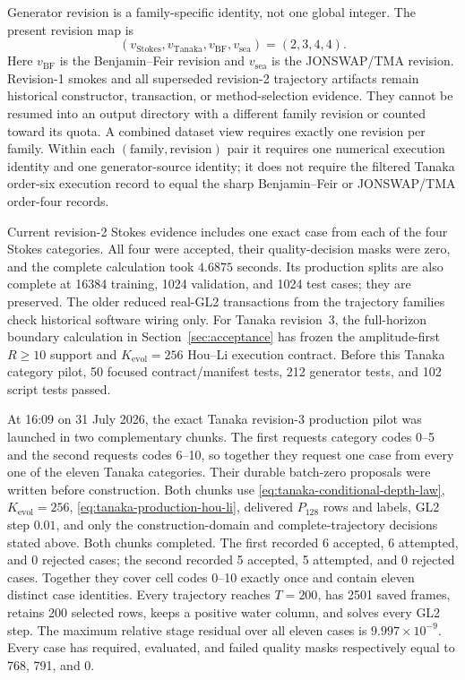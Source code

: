 \documentclass[11pt]{article}
\begin{document}
Generator revision is a family-specific identity, not one global integer.
The present revision map is
\begin{equation}
  (v_{\mathrm{Stokes}},v_{\mathrm{Tanaka}},v_{\mathrm{BF}},v_{\mathrm{sea}})
  =(2,3,4,4).
  \label{eq:paper-family-revisions}
\end{equation}
Here $v_{\mathrm{BF}}$ is the Benjamin--Feir revision and $v_{\mathrm{sea}}$
is the JONSWAP/TMA revision.  Revision-1 smokes and all superseded revision-2
trajectory artifacts remain historical constructor, transaction, or
method-selection evidence.  They cannot be resumed into an output directory
with a different family revision or counted toward its quota.  A combined dataset view requires
exactly one revision per family.  Within each
$(\text{family},\text{revision})$ pair it requires one numerical execution
identity and one generator-source identity; it does not require the filtered
Tanaka order-six execution record to equal the sharp Benjamin--Feir or
JONSWAP/TMA order-four records.

Current revision-2 Stokes evidence includes one exact case from each of
the four Stokes categories.  All four were accepted, their quality-decision
masks were zero, and the complete calculation took $4.6875$ seconds.  Its
production splits are also complete at 16384 training, 1024 validation, and
1024 test cases; they are preserved.  The
older reduced real-GL2 transactions from the trajectory families check
historical software wiring only.  For Tanaka revision~3, the full-horizon
boundary calculation in Section~\ref{sec:acceptance} has frozen the
amplitude-first $R\geq10$ support and $K_{\mathrm{evol}}=256$ Hou--Li
execution contract.  Before this Tanaka category pilot, 50 focused
contract/manifest tests, 212 generator tests, and 102 script tests passed.

At 16:09 on 31 July 2026, the exact Tanaka revision-3 production pilot was
launched in two complementary chunks.  The first requests category codes
0--5 and the second requests codes 6--10, so together they request one case
from every one of the eleven Tanaka categories.  Their durable batch-zero
proposals were written before construction.  Both chunks use
\eqref{eq:tanaka-conditional-depth-law},
$K_{\mathrm{evol}}=256$, \eqref{eq:tanaka-production-hou-li}, delivered
$P_{128}$ rows and labels, GL2 step $0.01$, and only the construction-domain
and complete-trajectory decisions stated above.  Both chunks completed.  The
first recorded 6 accepted, 6 attempted, and 0 rejected cases; the second
recorded 5 accepted, 5 attempted, and 0 rejected cases.  Together they cover
cell codes 0--10 exactly once and contain eleven distinct case identities.
Every trajectory reaches $T=200$, has 2501 saved frames, retains 200 selected
rows, keeps a positive water column, and solves every GL2 step.  The maximum
relative stage residual over all eleven cases is
$9.997\times10^{-9}$.  Every case has required, evaluated, and failed quality
masks respectively equal to 768, 791, and 0.
\end{document}
